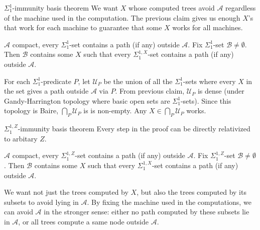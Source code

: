 \begin{frame}{$\Sigma_1^1$-immunity basis theorem}
  We want $X$ whose computed trees avoid $\mathcal{A}$ regardless of the
  machine used in the computation. The previous claim gives us enough $X$'s
  that work for each machine to guarantee that some $X$ works for
  all machines.

  \vspace{1em}
  \begin{thm}
    $\mathcal{A}$ compact, every $\Sigma_1^{1}$-set contains a path (if
    any) outside $\mathcal{A}$. Fix $\Sigma_1^{1}$-set
    $\mathcal{B}\neq\emptyset$. Then $\mathcal{B}$ contains some $X$ such
    that every $\Sigma_1^{1,X}$-set contains a path (if any) outside
    $\mathcal{A}$.
  \end{thm}

  \vspace{1em}
  For each $\Sigma_1^1$-predicate $P$, let $\mathcal{U}_P$ be the union of
  all the $\Sigma_1^1$-sets where every $X$ in the set gives a path outside
  $\mathcal{A}$ via $P$. From previous claim, $\mathcal{U}_P$ is dense
  (under Gandy-Harrington topology where basic open sets are
  $\Sigma_1^1$-sets). Since this topology is Baire,
  $\bigcap_P\mathcal{U}_P$ is is non-empty. Any
  $X\in\bigcap_P\mathcal{U}_P$ works.
\end{frame}

\begin{frame}{$\Sigma_1^{1,Z}$-immunity basis theorem}
  Every step in the proof can be directly relativized to arbitary $Z$.
  \vspace{0.5em}
  \begin{thm}
    $\mathcal{A}$ compact, every $\Sigma_1^{1,Z}$-set contains a path
    (if any) outside $\mathcal{A}$. Fix $\Sigma_1^{1,Z}$-set
    $\mathcal{B}\neq\emptyset$. Then $\mathcal{B}$ contains some $X$ such
    that every $\Sigma_1^{1,X}$-set contains a path (if any) outside
    $\mathcal{A}$.
  \end{thm}

  \vspace{1em}
  We want not just the trees computed by $X$, but also the trees computed
  by its subsets to avoid lying in $\mathcal{A}$. By fixing the machine
  used in the computations, we can avoid $\mathcal{A}$ in the stronger
  sense: either no path computed by these subsets lie in $\mathcal{A}$, or
  all trees compute a same node outside $\mathcal{A}$.
\end{frame}

